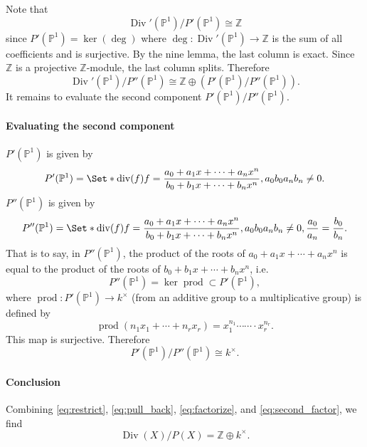 \documentclass{article}
\begin{document}
Note that
\begin{equation*}
    \operatorname{Div}'(\mathbb{P}^1)/P'(\mathbb{P}^1) \cong \mathbb{Z}
\end{equation*}
since $P'(\mathbb{P}^1) = \ker(\operatorname{deg})$ where $\operatorname{deg}\colon\operatorname{Div}'(\mathbb{P}^1)\to\mathbb{Z}$ is the sum of all coefficients and is surjective.
By the nine lemma, the last column is exact.
Since $\mathbb{Z}$ is a projective $\mathbb{Z}$-module, the last column splits.
Therefore
\begin{equation}
    \label{eq:factorize} \operatorname{Div}'(\mathbb{P}^1)/P''(\mathbb{P}^1) \cong \mathbb{Z} \oplus (P'(\mathbb{P}^1)/P''(\mathbb{P}^1)).
\end{equation}
It remains to evaluate the second component $P'(\mathbb{P}^1)/P''(\mathbb{P}^1)$.

\paragraph*{Evaluating the second component}
$P'(\mathbb{P}^1)$ is given by
\[ P'(\mathbb{P}^1) = \Set*{\operatorname{div}(f)}{f = \frac{a_0 + a_1 x + \cdots + a_n x^n}{b_0 + b_1 x + \cdots + b_n x^n}, a_0 b_0 a_n b_n \neq 0}. \]
$P''(\mathbb{P}^1)$ is given by
\[ P''(\mathbb{P}^1) = \Set*{\operatorname{div}(f)}{f = \frac{a_0 + a_1 x + \cdots + a_n x^n}{b_0 + b_1 x + \cdots + b_n x^n}, a_0 b_0 a_n b_n \neq 0, \frac{a_0}{a_n} = \frac{b_0}{b_n}}. \]
That is to say, in $P''(\mathbb{P}^1)$, the product of the roots of $a_0 + a_1 x + \cdots + a_n x^n$ is equal to the product of the roots of $b_0 + b_1 x + \cdots + b_n x^n$, i.e.
\[ P''(\mathbb{P}^1) = \ker \operatorname{prod} \subset P'(\mathbb{P}^1), \]
where $\operatorname{prod}\colon P'(\mathbb{P}^1) \to k^\times$ (from an additive group to a multiplicative group) is defined by
\[ \operatorname{prod}(n_1 x_1 + \cdots + n_r x_r) = x_1^{n_1} \cdots \cdots \cdot x_r^{n_r}. \]
This map is surjective.
Therefore
\begin{equation}
    \label{eq:second_factor}
    P'(\mathbb{P}^1)/P''(\mathbb{P}^1) \cong k^\times.
\end{equation}

\paragraph*{Conclusion}%
Combining \eqref{eq:restrict}, \eqref{eq:pull_back}, \eqref{eq:factorize}, and \eqref{eq:second_factor}, we find
\[ \operatorname{Div}(X)/P(X) = \mathbb{Z} \oplus k^\times. \]
\end{document}
